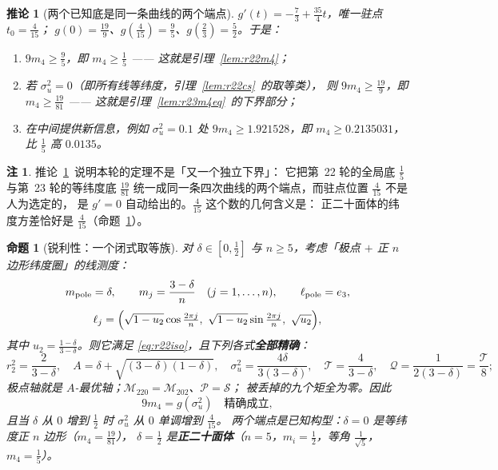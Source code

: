 \documentclass[UTF8,11pt]{ctexart}
\newtheorem{proposition}[theorem]{命题}
\newtheorem{corollary}[theorem]{推论}
\theoremstyle{definition}
\newtheorem{remark}[theorem]{注}
\begin{document}
\begin{corollary}[两个已知底是同一条曲线的两个端点]\label{cor:r24floors}
$g'(t)=-\frac73+\frac{35}4t$，唯一驻点 $t_0=\frac4{15}$；
$g(0)=\frac{19}9$、$g(\frac4{15})=\frac95$、$g(\frac23)=\frac52$。于是：
\begin{enumerate}\itemsep2pt
\item[(i)] $9m_4\ge\frac95$，即 $m_4\ge\frac15$ —— 这就是引理~\ref{lem:r22m4}；
\item[(ii)] 若 $\sigma_u^2=0$（即所有线等纬度，引理~\ref{lem:r22cs}~的取等类），
则 $9m_4\ge\frac{19}9$，即 $m_4\ge\frac{19}{81}$ —— 这就是引理~\ref{lem:r23m4eq}~的下界部分；
\item[(iii)] 在中间提供新信息，例如 $\sigma_u^2=0.1$ 处 $9m_4\ge1.921528$，即 $m_4\ge0.2135031$，
比 $\frac15$ 高 $0.0135$。
\end{enumerate}
\end{corollary}

\begin{remark}\label{rem:r24floors}
推论~\ref{cor:r24floors}~说明本轮的定理不是「又一个独立下界」：
它把第~22 轮的全局底 $\frac15$ 与第~23 轮的等纬度底 $\frac{19}{81}$
统一成同一条四次曲线的两个端点，而驻点位置 $\frac4{15}$ 不是人为选定的，
是 $g'=0$ 自动给出的。$\frac4{15}$ 这个数的几何含义是：
正二十面体的纬度方差恰好是 $\frac4{15}$（命题~\ref{prop:r24sharp}）。
\end{remark}

\begin{proposition}[锐利性：一个闭式取等族]\label{prop:r24sharp}
对 $\delta\in[0,\frac12]$ 与 $n\ge5$，考虑「极点 $+$ 正 $n$ 边形纬度圈」的线测度：
\[
m_{\rm pole}=\delta,\qquad m_j=\frac{3-\delta}n\quad(j=1,\dots,n),\qquad \ell_{\rm pole}=e_3,
\]
\[
\ell_j=\Bigl(\sqrt{1-u_2}\cos\tfrac{2\pi j}n,\ \sqrt{1-u_2}\sin\tfrac{2\pi j}n,\ \sqrt{u_2}\Bigr),
\]
其中 $u_2=\frac{1-\delta}{3-\delta}$。则它满足 \eqref{eq:r22iso}，且下列各式\textbf{全部精确}：
\begin{equation}\label{eq:r24family}
r_2^2=\frac2{3-\delta},\quad
A=\delta+\sqrt{(3-\delta)(1-\delta)},\quad
\sigma_u^2=\frac{4\delta}{3(3-\delta)},\quad
\mathcal{T}=\frac4{3-\delta},\quad
\mathcal{Q}=\frac1{2(3-\delta)}=\frac{\mathcal{T}}8 ;
\end{equation}
极点轴就是 $A$-最优轴；$\mathcal{M}_{220}=\mathcal{M}_{202}$、$\mathcal{P}=\mathcal{S}$；
被丢掉的九个矩全为零。因此
\begin{equation}\label{eq:r24attain}
9m_4=g(\sigma_u^2)\quad\text{精确成立},
\end{equation}
且当 $\delta$ 从 $0$ 增到 $\frac12$ 时 $\sigma_u^2$ 从 $0$ 单调增到 $\frac4{15}$。
两个端点是已知构型：$\delta=0$ 是等纬度正 $n$ 边形（$m_4=\frac{19}{81}$），
$\delta=\frac12$ 是\textbf{正二十面体}（$n=5$，$m_i=\frac12$，等角 $\frac1{\sqrt5}$，$m_4=\frac15$）。
\end{proposition}
\end{document}
